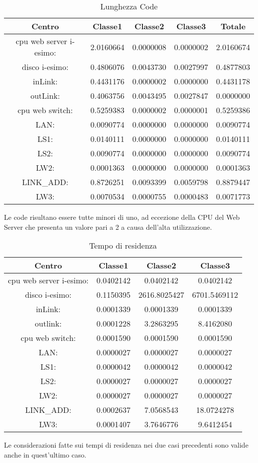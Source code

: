 \begin{table}[H]
\begin{center}
\begin{tabular}{||c|c|c|c|c||}
\hline
Centro &Classe1 &Classe2 &Classe3 &Totale\\
\hline
\hline
 cpu web server i-esimo: 	&2.0160664	&0.0000008	&0.0000002	&2.0160674	\\\hline
 disco i-esimo: 	&0.4806076	&0.0043730	&0.0027997	&0.4877803	\\\hline
 inLink: 	&0.4431176	&0.0000002	&0.0000000	&0.4431178	\\\hline
 outLink: 	&0.4063756	&0.0043495	&0.0027847	&0.0000000	\\\hline
 cpu web switch: 	&0.5259383	&0.0000002	&0.0000001	&0.5259386	\\\hline
 LAN: 	&0.0090774	&0.0000000	&0.0000000	&0.0090774	\\\hline
 LS1: 	&0.0140111	&0.0000000	&0.0000000	&0.0140111	\\\hline
 LS2: 	&0.0090774	&0.0000000	&0.0000000	&0.0090774	\\\hline
 LW2: 	&0.0001363	&0.0000000	&0.0000000	&0.0001363	\\\hline
 LINK\_ADD: 	&0.8726251	&0.0093399	&0.0059798	&0.8879447	\\\hline
 LW3: 	&0.0070534	&0.0000755	&0.0000483	&0.0071773	\\\hline
\end{tabular}
\end{center}
\caption{Lunghezza Code}
\label{lunghezzacode}
\end{table}
Le code risultano essere tutte minori di uno, ad eccezione della CPU del Web Server che presenta un valore pari a 2 a causa dell'alta utilizzazione.
\begin{table}[H]
\begin{center}
\begin{tabular}{||c|c|c|c||}
\hline
Centro &Classe1 &Classe2 &Classe3\\
\hline
\hline
 cpu web server i-esimo: 	&0.0402142	&0.0402142	&0.0402142	\\\hline
 disco i-esimo: 	&0.1150395	&2616.8025427	&6701.5469112	\\\hline
 inLink: 	&0.0001339	&0.0001339	&0.0001339	\\\hline
 outlink: 	&0.0001228	&3.2863295	&8.4162080	\\\hline
 cpu web switch: 	&0.0001590	&0.0001590	&0.0001590	\\\hline
 LAN: 	&0.0000027	&0.0000027	&0.0000027	\\\hline
 LS1: 	&0.0000042	&0.0000042	&0.0000042	\\\hline
 LS2: 	&0.0000027	&0.0000027	&0.0000027	\\\hline
 LW2: 	&0.0000027	&0.0000027	&0.0000027	\\\hline
 LINK\_ADD: 	&0.0002637	&7.0568543	&18.0724278	\\\hline
 LW3: 	&0.0001407	&3.7646776	&9.6412454	\\\hline\hline
\end{tabular}
\end{center}
\caption{Tempo di residenza}
\label{tempodiresidenza}
\end{table}
Le considerazioni fatte sui tempi di residenza nei due casi precedenti sono valide anche in quest'ultimo caso. 
